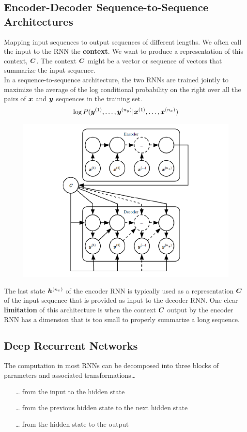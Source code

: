 \begin{multicols}{2}
	\subsection{Encoder-Decoder Sequence-to-Sequence Architectures}
	Mapping input sequences to output sequences of different lengths.
	We often call the input to the RNN the \textbf{context}. We want to produce a representation of this context, ${\bm{C}}$. The context ${\bm{C}}$ might be a vector or sequence of vectors that summarize the input sequence.\\
	In a sequence-to-sequence architecture, the two RNNs are trained jointly to maximize the average of the log conditional probability on the right over all the pairs of ${\bm{x}}$ and ${\bm{y}}$ sequences in the training set.
	\[ \log P({\bm{y}}^{(1)},\dots,{\bm{y}}^{(n_y)}|{\bm{x}}^{(1)},\dots,{\bm{x}}^{(n_x)}) \]
	\begin{figure}[H]
		\centering
		\includegraphics[width=0.8\linewidth]{images/encdec.png}
	\end{figure}
	The last state ${\bm{h}}^{(n_x)}$ of the encoder RNN is typically used as a representation ${\bm{C}}$ of the input sequence that is provided as input to the decoder RNN.
	One clear \textbf{limitation} of this architecture is when the context ${\bm{C}}$ output by the encoder RNN has a dimension that is too small to properly summarize a long sequence.
	
	\subsection{Deep Recurrent Networks}
	The computation in most RNNs can be decomposed into three blocks of parameters and associated transformations\dots
	\begin{itemize}
		\item[\dots] from the input to the hidden state
		\item[\dots] from the previous hidden state to the next hidden state
		\item[\dots] from the hidden state to the output
	\end{itemize}
	

\end{multicols}
